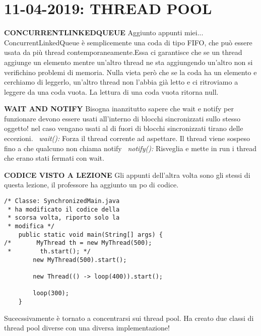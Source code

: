 

\newpage
\section{11-04-2019: THREAD POOL}
\noindent \textbf{CONCURRENTLINKEDQUEUE} \newline
Aggiunto appunti miei... ConcurrentLinkedQueue è semplicemente una coda di tipo FIFO, che può essere usata da più thread contemporaneamente.Essa ci garantisce che se un thread aggiunge un elemento mentre un'altro thread ne sta aggiungendo un'altro non si verifichino problemi di memoria. Nulla vieta però che se la coda ha un elemento e cerchiamo di leggerlo, un'altro thread non l'abbia già letto e ci ritroviamo a leggere da una coda vuota. La lettura di una coda vuota ritorna null.

\noindent \textbf{WAIT AND NOTIFY} \newline
Bisogna inanzitutto sapere che wait e notify per funzionare devono essere usati all'interno di blocchi sincronizzati sullo stesso oggetto! nel caso vengano usati al di fuori di blocchi sincronizzati tirano delle eccezioni. \newline
\textbullet\ \textit{wait():} Forza il thread corrente ad aspettare. Il thread viene sospeso fino a che qualcuno non chiama notify \newline
\textbullet\ \textit{notify():} Risveglia e mette in run i thread che erano stati fermati con wait.

\noindent \textbf{CODICE VISTO A LEZIONE} \newline
\noindent Gli appunti dell'altra volta sono gli stessi di questa lezione, il professore ha aggiunto un po di codice.
 


\begin{lstlisting}[basicstyle=\small,]
/* Classe: SynchronizedMain.java 
 * ha modificato il codice della 
 * scorsa volta, riporto solo la
 * modifica */
    public static void main(String[] args) {
/*       MyThread th = new MyThread(500);
 *        th.start(); */
        new MyThread(500).start();

        new Thread(() -> loop(400)).start();

        loop(300);
    }
\end{lstlisting}

\noindent Sucecssivamente è tornato a concentrarsi sui thread pool. \newline
Ha creato due classi di thread pool diverse con una diversa implementazione!

